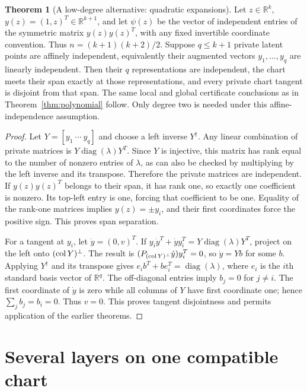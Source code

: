 \documentclass[11pt,a4paper]{article}
\theoremstyle{definition}
\newtheorem{theorem}{Theorem}[section]
\theoremstyle{definition}
\theoremstyle{remark}\newtheorem{remark}[theorem]{Remark}
\newcommand{\R}{\mathbb R}\newcommand{\Prob}{\mathbb P}\newcommand{\E}{\mathbb E}
\newcommand{\diag}{\operatorname{diag}}\newcommand{\tr}{\operatorname{tr}}
\begin{document}
\begin{theorem}[A low-degree alternative: quadratic expansions]\label{thm:quadratic}
Let $z\in\R^k$, $y(z)=(1,z)^T\in\R^{k+1}$, and let $\psi(z)$ be the vector of independent entries of the symmetric matrix $y(z)y(z)^T$, with any fixed invertible coordinate convention. Thus $n=(k+1)(k+2)/2$. Suppose $q\le k+1$ private latent points are affinely independent, equivalently their augmented vectors $y_1,\ldots,y_q$ are linearly independent. Then their $q$ representations are independent, the chart meets their span exactly at those representations, and every private chart tangent is disjoint from that span. The same local and global certificate conclusions as in Theorem~\ref{thm:polynomial} follow. Only degree two is needed under this affine-independence assumption.
\end{theorem}
\begin{proof}
Let $Y=[y_1\ \cdots\ y_q]$ and choose a left inverse $Y^\dagger$. Any linear combination of private matrices is $Y\diag(\lambda)Y^T$. Since $Y$ is injective, this matrix has rank equal to the number of nonzero entries of $\lambda$, as can also be checked by multiplying by the left inverse and its transpose. Therefore the private matrices are independent. If $y(z)y(z)^T$ belongs to their span, it has rank one, so exactly one coefficient is nonzero. Its top-left entry is one, forcing that coefficient to be one. Equality of the rank-one matrices implies $y(z)=\pm y_i$, and their first coordinates force the positive sign. This proves span separation.

For a tangent at $y_i$, let $\dot y=(0,v)^T$. If $y_i\dot y^T+\dot y y_i^T=Y\diag(\lambda)Y^T$, project on the left onto $(\operatorname{col} Y)^\perp$. The result is $(P_{(\operatorname{col} Y)^\perp}\dot y)y_i^T=0$, so $\dot y=Yb$ for some $b$. Applying $Y^\dagger$ and its transpose gives $e_i b^T+b e_i^T=\diag(\lambda)$, where $e_i$ is the $i$th standard basis vector of $\R^q$. The off-diagonal entries imply $b_j=0$ for $j\ne i$. The first coordinate of $\dot y$ is zero while all columns of $Y$ have first coordinate one; hence $\sum_jb_j=b_i=0$. Thus $v=0$. This proves tangent disjointness and permits application of the earlier theorems.
\end{proof}

\clearpage
\section{Several layers on one compatible chart}\label{sec:multilayer}
\end{document}
